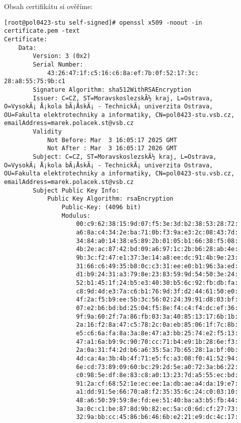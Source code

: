 Obsah certifikátu si ověříme:
\begin{verbatim}
[root@pol0423-stu self-signed]# openssl x509 -noout -in
certificate.pem -text
Certificate:
    Data:
        Version: 3 (0x2)
        Serial Number:
            43:26:47:1f:c5:16:c6:8a:ef:7b:0f:52:17:3c:
28:a8:55:75:9b:c1
        Signature Algorithm: sha512WithRSAEncryption
        Issuer: C=CZ, ST=MoravskoslezskÃ½ kraj, L=Ostrava,
O=VysokÃ¡ Å¡kola bÃ¡ÅskÃ¡ - TechnickÃ¡ univerzita Ostrava,
OU=Fakulta elektrotechniky a informatiky, CN=pol0423-stu.vsb.cz,
emailAddress=marek.polacek.st@vsb.cz
        Validity
            Not Before: Mar  3 16:05:17 2025 GMT
            Not After : Mar  3 16:05:17 2026 GMT
        Subject: C=CZ, ST=MoravskoslezskÃ½ kraj, L=Ostrava,
O=VysokÃ¡ Å¡kola bÃ¡ÅskÃ¡ - TechnickÃ¡ univerzita Ostrava,
OU=Fakulta elektrotechniky a informatiky, CN=pol0423-stu.vsb.cz,
emailAddress=marek.polacek.st@vsb.cz
        Subject Public Key Info:
            Public Key Algorithm: rsaEncryption
                Public-Key: (4096 bit)
                Modulus:
                    00:c9:62:38:15:9d:07:f5:3e:3d:b2:38:53:28:72:
                    a6:8a:c4:34:2e:ba:71:0b:f3:9a:e3:2c:08:43:7d:
                    34:84:a0:14:38:e5:89:2b:01:05:b1:66:38:f5:08:
                    4b:2e:ac:87:42:bd:09:a6:97:1c:2b:b6:28:ab:4e:
                    9b:3c:f2:47:e1:37:3e:14:a8:ee:dc:91:4b:9e:23:
                    31:66:c6:49:35:b8:0c:c3:31:ee:e0:b1:96:3a:ed:
                    d1:b9:24:31:a3:79:8e:23:83:59:9d:54:50:3e:24:
                    52:b1:45:1f:24:b5:e3:40:30:b5:6c:92:fb:db:fa:
                    c8:9d:4d:e3:7a:c6:b1:76:9d:3f:d2:44:61:50:e0:
                    4f:2a:f5:b9:ee:5b:3c:56:02:24:39:91:d8:03:bf:
                    07:e2:b6:bd:bd:25:04:f5:8e:f4:c4:f4:dc:ef:36:
                    9f:9a:60:2f:7a:86:fb:03:3a:40:85:13:17:6b:1b:
                    2a:16:f2:8a:47:c5:78:2c:0a:eb:85:06:1f:7c:8b:
                    e5:c6:6a:fa:8a:3a:8e:47:a3:bb:25:74:e2:f5:13:
                    47:a1:6a:b9:9c:90:70:cc:71:b4:e9:1b:28:6e:f3:
                    2a:0a:31:f4:2d:b6:a6:35:5a:7b:65:28:1a:bf:0b:
                    4d:ca:4a:3b:4b:4f:71:e5:fc:a3:08:f0:41:52:94:
                    6e:cd:73:89:09:60:bc:29:2d:5e:a0:72:3a:b6:22:
                    c0:98:5e:df:8e:83:c8:a0:13:23:7d:a5:55:ec:bd:
                    91:2a:cf:68:52:1e:ec:ee:1a:db:ae:a4:da:19:e7:
                    a1:dd:91:5e:66:70:a8:f2:35:35:6c:24:c0:03:10:
                    48:a6:50:39:59:8e:fd:ee:51:40:ba:a3:b5:fb:44:
                    3a:0c:c1:be:87:8d:9b:82:ec:5a:c0:6d:cf:27:73:
                    32:9a:bb:cc:45:86:b6:46:6b:e2:21:e9:dc:4c:17:

\end{verbatim}
